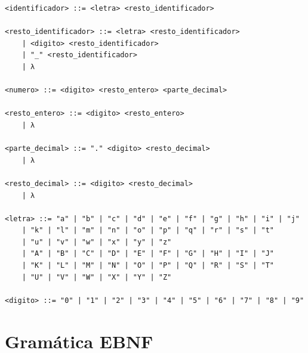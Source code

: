 \documentclass[11pt, a4paper]{article}
\begin{document}
\begin{lstlisting}[style=gramatica]
<identificador> ::= <letra> <resto_identificador>

<resto_identificador> ::= <letra> <resto_identificador>
    | <digito> <resto_identificador>
    | "_" <resto_identificador>
    | λ

<numero> ::= <digito> <resto_entero> <parte_decimal>

<resto_entero> ::= <digito> <resto_entero>
    | λ

<parte_decimal> ::= "." <digito> <resto_decimal>
    | λ

<resto_decimal> ::= <digito> <resto_decimal>
    | λ

<letra> ::= "a" | "b" | "c" | "d" | "e" | "f" | "g" | "h" | "i" | "j"
    | "k" | "l" | "m" | "n" | "o" | "p" | "q" | "r" | "s" | "t"
    | "u" | "v" | "w" | "x" | "y" | "z"
    | "A" | "B" | "C" | "D" | "E" | "F" | "G" | "H" | "I" | "J"
    | "K" | "L" | "M" | "N" | "O" | "P" | "Q" | "R" | "S" | "T"
    | "U" | "V" | "W" | "X" | "Y" | "Z"

<digito> ::= "0" | "1" | "2" | "3" | "4" | "5" | "6" | "7" | "8" | "9"
\end{lstlisting}

\section{Gramática EBNF}
\end{document}
